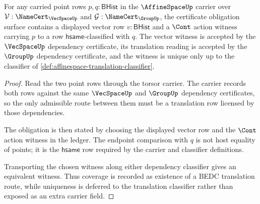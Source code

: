 \begin{theorem}
\label{thm:affinespace-action-coverage-obligation}
For any carried point rows $p,q:\mathsf{BHist}$ in the $\AffineSpaceUp$ carrier over $\mathcal{V}:\NameCert_{\VecSpaceUp}$ and $\mathcal{G}:\NameCert_{\GroupUp}$, the certificate obligation surface contains a displayed vector row $v:\mathsf{BHist}$ and a $\Cont$ action witness carrying $p$ to a row $\mathsf{hsame}$-classified with $q$. The vector witness is accepted by the $\VecSpaceUp$ dependency certificate, its translation reading is accepted by the $\GroupUp$ dependency certificate, and the witness is unique only up to the classifier of \autoref{def:affinespace-translation-classifier}.
\end{theorem}
\begin{proof}
Read the two point rows through the torsor carrier. The carrier records both rows against the same $\VecSpaceUp$ and $\GroupUp$ dependency certificates, so the only admissible route between them must be a translation row licensed by those dependencies.

The obligation is then stated by choosing the displayed vector row and the $\Cont$ action witness in the ledger. The endpoint comparison with $q$ is not host equality of points; it is the $\mathsf{hsame}$ row required by the carrier and classifier definitions.

Transporting the chosen witness along either dependency classifier gives an equivalent witness. Thus coverage is recorded as existence of a BEDC translation route, while uniqueness is deferred to the translation classifier rather than exposed as an extra carrier field.
\end{proof}

